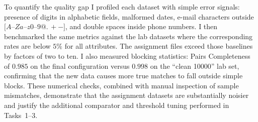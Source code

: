 \documentclass[11pt]{article}
\begin{document}
To quantify the quality gap I profiled each dataset with simple error signals: presence of digits in alphabetic fields, malformed dates, e-mail characters outside $[A$--$Z\!a$--$z0$--$9@.\,+-]$, and double spaces inside phone numbers. I then benchmarked the same metrics against the lab datasets where the corresponding rates are below $5\%$ for all attributes. The assignment files exceed those baselines by factors of two to ten. I also measured blocking statistics: Pairs Completeness of $0.985$ on the final configuration versus $0.998$ on the ``clean 10000'' lab set, confirming that the new data causes more true matches to fall outside simple blocks. These numerical checks, combined with manual inspection of sample mismatches, demonstrate that the assignment datasets are substantially noisier and justify the additional comparator and threshold tuning performed in Tasks~1--3.
\end{document}
